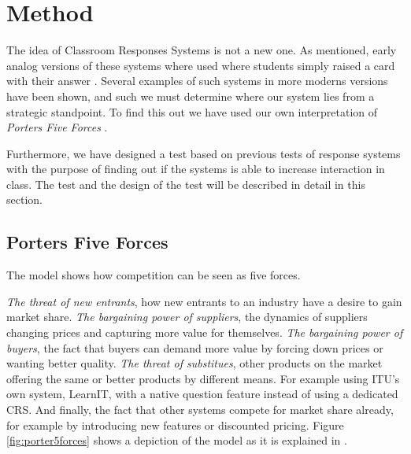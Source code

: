 \section{Method}



The idea of Classroom Responses Systems is not a new one. As mentioned, early analog versions of these systems where used where students simply raised a card with their answer \cite[p.~257]{stowell2007benefits}. Several examples of such systems in more moderns versions have been shown, and such we must determine where our system lies from a strategic standpoint. To find this out we have used our own interpretation of \emph{Porters Five Forces} \cite{porter1979competitive}.

Furthermore, we have designed a test based on previous tests of response systems with the purpose of finding out if the systems is able to increase interaction in class. The test and the design of the test will be described in detail in this section.




\subsection{Porters Five Forces}
The model shows how competition can be seen as five forces. 

\emph{The threat of new entrants}, how new entrants to an industry have a desire to gain market share. \emph{The bargaining power of suppliers}, the dynamics of suppliers changing prices and capturing more value for themselves. \emph{The bargaining power of buyers}, the fact that buyers can demand more value by forcing down prices or wanting better quality. \emph{The threat of substitues}, other products on the market offering the same or better products by different means. For example using ITU's own system, LearnIT, with a native question feature instead of using a dedicated CRS. And finally, the fact that other systems compete for market share already, for example by introducing new features or discounted pricing. Figure \ref{fig:porter5forces} shows a depiction of the model as it is explained in .


